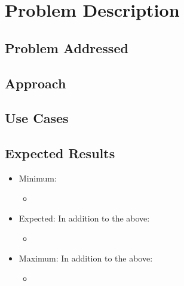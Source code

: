 \section{Problem Description}

\subsection{Problem Addressed}


\subsection{Approach}


\subsection{Use Cases}

\subsection{Expected Results}
\begin{itemize}
	\item Minimum:
	\begin{itemize}
		\item
	\end{itemize}
	\item Expected:
	In addition to the above:
	\begin{itemize}
		\item 
	\end{itemize}
	\item Maximum:
	In addition to the above:
	\begin{itemize}
		\item 
	\end{itemize}
\end{itemize}
